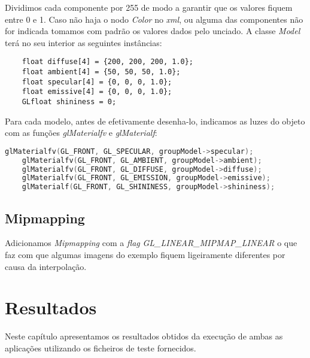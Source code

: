 \documentclass[14pt, a4 paper]{report}
\begin{document}
Dividimos cada componente por 255 de modo a garantir que os valores fiquem entre 0 e 1. Caso não haja o nodo \textit{Color} no \textit{xml}, ou alguma das componentes não for indicada tomamos com padrão os valores dados pelo unciado. A classe \textit{Model} terá no seu interior as seguintes instâncias:

\begin{lstlisting}
    float diffuse[4] = {200, 200, 200, 1.0};
    float ambient[4] = {50, 50, 50, 1.0};
    float specular[4] = {0, 0, 0, 1.0};
    float emissive[4] = {0, 0, 0, 1.0};
    GLfloat shininess = 0;
\end{lstlisting}

Para cada modelo, antes de efetivamente desenha-lo, indicamos as luzes do objeto com as funções \textit{glMaterialfv} e \textit{glMaterialf}:

\begin{lstlisting}[language = c++]
    glMaterialfv(GL_FRONT, GL_SPECULAR, groupModel->specular);
	glMaterialfv(GL_FRONT, GL_AMBIENT, groupModel->ambient);
    glMaterialfv(GL_FRONT, GL_DIFFUSE, groupModel->diffuse);
    glMaterialfv(GL_FRONT, GL_EMISSION, groupModel->emissive);
    glMaterialf(GL_FRONT, GL_SHININESS, groupModel->shininess);
\end{lstlisting}

\section{Mipmapping}
Adicionamos \textit{Mipmapping} com a \textit{flag} \textit{GL\_LINEAR\_MIPMAP\_LINEAR} o que faz com que algumas imagens do exemplo fiquem ligeiramente diferentes por causa da interpolação.

\chapter{Resultados} \label{chap:resultado}

Neste capítulo apresentamos os resultados obtidos da execução de ambas as aplicações utilizando os ficheiros de teste fornecidos.
\end{document}

